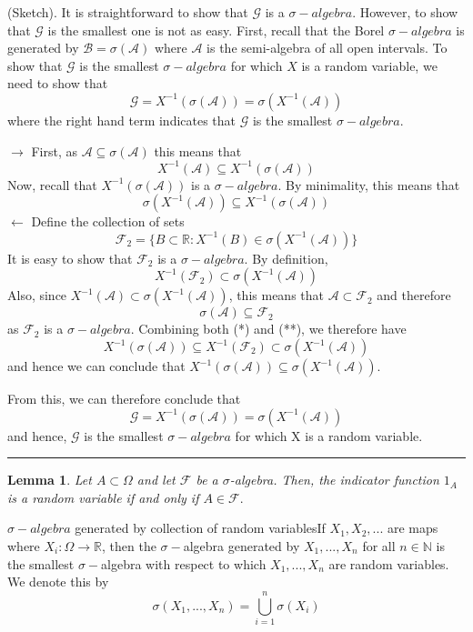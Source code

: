 \documentclass[twoside]{article}
\newtheorem{lemma}[theorem]{Lemma}
\newenvironment{proof}{{\bf Proof:}}{\hfill\rule{2mm}{2mm}}
\newcommand{\algebra}{\mathcal{A}}
\newcommand{\sigmalgebra}{\mathcal{F}}
\newcommand{\borelsigmaalgebra}{\mathcal{B}}
\newcommand{\sa}{\sigma-algebra}
\begin{document}
\begin{proof}(Sketch). It is straightforward to show that $\mathcal{G}$ is a $\sa.$ However, to show that $\mathcal{G}$ is the smallest one is not as easy. First, recall that the Borel $\sa$ is generated by $\borelsigmaalgebra = \sigma(\algebra)$ where $\algebra$ is the semi-algebra of all open intervals. To show that $\mathcal{G}$ is the smallest $\sa$ for which $X$ is a random variable, we need to show that 
$$
\mathcal{G} = X^{-1}(\sigma(\algebra)) = \sigma(X^{-1}(\algebra))
$$
where the right hand term indicates that $\mathcal{G}$ is the smallest $\sa.$ 

$\rightarrow$ First, as $\algebra \subseteq \sigma(\algebra)$ this means that 
$$
X^{-1}(\algebra) \subseteq X^{-1}(\sigma(\algebra))
$$
Now, recall that $X^{-1}(\sigma(\algebra))$ is a $\sa.$ By minimality, this means that 
$$
\sigma(X^{-1}(\algebra)) \subseteq X^{-1}(\sigma(\algebra))
$$
$\leftarrow$ Define the collection of sets 
$$
\sigmalgebra_2 = \{B \subset \mathbb{R}: X^{-1}(B) \in \sigma(X^{-1}(\algebra)) \}
$$
It is easy to show that $\sigmalgebra_2$ is a $\sa.$ By definition,
\begin{equation}
X^{-1}(\sigmalgebra_2) \subset \sigma(X^{-1}(\algebra))
\tag{*}
\end{equation}
Also, since $X^{-1}(\algebra) \subset \sigma(X^{-1}(\algebra))$, this means that $\algebra \subset \sigmalgebra_2$ and therefore
\begin{equation}
\sigma(\algebra) \subseteq \sigmalgebra_2
\tag{**}
\end{equation}
as $\sigmalgebra_2$ is a $\sa.$ Combining both (*) and (**), we therefore have 
$$
X^{-1}(\sigma(\algebra)) \subseteq X^{-1}(\sigmalgebra_2) \subset \sigma(X^{-1}(\algebra))
$$
and hence we can conclude that $X^{-1}(\sigma(\algebra)) \subseteq \sigma(X^{-1}(\algebra)).$

From this, we can therefore conclude that 
$$
\mathcal{G} = X^{-1}(\sigma(\algebra)) = \sigma(X^{-1}(\algebra))
$$
and hence, $\mathcal{G}$ is the smallest $\sa$ for which X is a random variable.
\end{proof}



\begin{lemma}Let $A \subset \Omega$ and let $\mathcal{F}$ be a $\sigma$-algebra. Then, the indicator function $1_A$ is a random variable if and only if $A \in \mathcal{F}.$
\end{lemma}


\begin{definition_exam}{$\sa$ generated by collection of random variables}{}If $X_1,X_2,...$ are maps where $X_i: \Omega \rightarrow \mathbb{R}$, then the $\sigma-$algebra generated by $X_1,...,X_n$ for all $n \in \mathbb{N}$ is the smallest $\sigma-$algebra with respect to which $X_1,...,X_n$ are random variables. We denote this by $$\sigma(X_1,...,X_n) = \bigcup_{i=1}^{n}\sigma(X_i)$$
\end{definition_exam}
\end{document}
